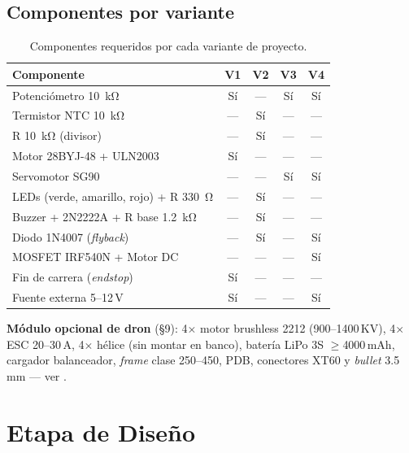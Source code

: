 \documentclass[11pt]{article}
\begin{document}
\subsection{Componentes por variante}
\begin{table}[H]\centering
\caption{Componentes requeridos por cada variante de proyecto.}
\begin{tabular}{lcccc}
\toprule
Componente & V1 & V2 & V3 & V4 \\
\midrule
Potenciómetro \SI{10}{\kilo\ohm} & Sí & --- & Sí & Sí \\
Termistor NTC \SI{10}{\kilo\ohm} & --- & Sí & --- & --- \\
R \SI{10}{\kilo\ohm} (divisor) & --- & Sí & --- & --- \\
Motor 28BYJ-48 + ULN2003 & Sí & --- & --- & --- \\
Servomotor SG90 & --- & --- & Sí & Sí \\
LEDs (verde, amarillo, rojo) + R \SI{330}{\ohm} & --- & Sí & --- & --- \\
Buzzer + 2N2222A + R base \SI{1.2}{\kilo\ohm} & --- & Sí & --- & --- \\
Diodo 1N4007 (\emph{flyback}) & --- & Sí & --- & Sí \\
MOSFET IRF540N + Motor DC & --- & --- & --- & Sí \\
Fin de carrera (\emph{endstop}) & Sí & --- & --- & --- \\
Fuente externa 5--12\,V & Sí & --- & --- & Sí \\
\bottomrule
\end{tabular}
\end{table}
\textbf{Módulo opcional de dron} (\S9): 4$\times$ motor brushless 2212 (900--1400\,KV),
4$\times$ ESC 20--30\,A, 4$\times$ hélice (sin montar en banco), batería LiPo 3S
$\ge$4000\,mAh, cargador balanceador, \emph{frame} clase 250--450, PDB, conectores XT60 y
\emph{bullet} 3.5\,mm — ver .

\section{Etapa de Diseño}
\end{document}
